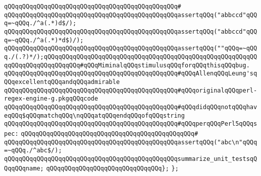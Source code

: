 \verb|qQQqqQQqqQQqqQQqqQQqqQQqqQQqqQQqqQQqqQQqqQQqqQQq#|\newline
\verb|qQQqqQQqqQQqqQQqqQQqqQQqqQQqqQQqqQQqqQQqqQQqqQQqassertqQQq("abbccd"qQQq=~qQQq./^a(.*)d$/);|\newline
\verb|qQQqqQQqqQQqqQQqqQQqqQQqqQQqqQQqqQQqqQQqqQQqqQQqassertqQQq("abbccd"qQQq=~qQQq./^a(.*)*d$)/);|\newline
\verb|qQQqqQQqqQQqqQQqqQQqqQQqqQQqqQQqqQQqqQQqqQQqqQQqassertqQQq(""qQQq=~qQQq./(.?)*/);qQQqqQQqqQQqqQQqqQQqqQQqqQQqqQQqqQQqqQQqqQQqqQQqqQQqqQQqqQQqqQQqqQQqqQQqqQQqqQQq#qQQqMiminalqQQqstimulusqQQqforqQQqthisqQQqbug.|\newline
\newline
\verb|qQQqqQQqqQQqqQQqqQQqqQQqqQQqqQQqqQQqqQQqqQQqqQQq#qQQqAllenqQQqLeung'sqQQqexcellentqQQqandqQQqadmirable|\newline
\verb|qQQqqQQqqQQqqQQqqQQqqQQqqQQqqQQqqQQqqQQqqQQqqQQq#qQQqoriginalqQQqperl-regex-engine-g.pkgqQQqcode|\newline
\verb|qQQqqQQqqQQqqQQqqQQqqQQqqQQqqQQqqQQqqQQqqQQqqQQq#qQQqdidqQQqnotqQQqhaveqQQq$qQQqmatchqQQq\nqQQqatqQQqendqQQqofqQQqstring|\newline
\verb|qQQqqQQqqQQqqQQqqQQqqQQqqQQqqQQqqQQqqQQqqQQqqQQq#qQQqperqQQqPerl5qQQqspec:|\newline
\verb|qQQqqQQqqQQqqQQqqQQqqQQqqQQqqQQqqQQqqQQqqQQqqQQq#|\newline
\verb|qQQqqQQqqQQqqQQqqQQqqQQqqQQqqQQqqQQqqQQqqQQqqQQqassertqQQq("abc\n"qQQq=~qQQq./^abc$/);|\newline
\newline
\verb|qQQqqQQqqQQqqQQqqQQqqQQqqQQqqQQqqQQqqQQqqQQqqQQqsummarize_unit_testsqQQqqQQqname;|\newline
\verb|qQQqqQQqqQQqqQQqqQQqqQQqqQQqqQQq};|\newline
\verb|};|\newline
\newline

